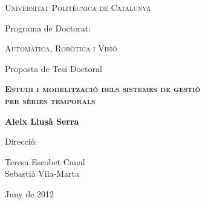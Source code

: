 \begin{titlepage}
  \begin{center} 

   

    {\Large \scshape Universitat Politècnica de Catalunya} \vskip 1cm 

    {Programa de Doctorat:} \vskip 0.5cm 
    
    {\scshape Automàtica, Robòtica i Visió} \vskip 4cm 

    {Proposta de Tesi Doctoral} \vskip 1cm 
    
    {\scshape \bfseries \Large Estudi i modelització dels sistemes de gestió\\
       per sèries temporals} \vskip 2cm

    {\bfseries Aleix Llusà Serra} \vskip 4cm 

    {Direcció:}
       
    {Teresa Escobet Canal \\
    Sebastià Vila-Marta}  \vskip 1cm 

    \vfill 

    {Juny de 2012}

\end{center}
\end{titlepage}




